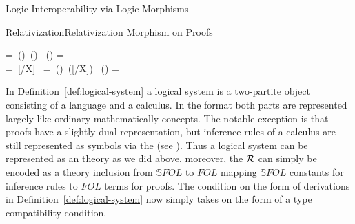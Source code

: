 \begin{tsubsection}[id=logic-morphisms]{Logic Interoperability via Logic Morphisms}
\begin{myfig}{Relativization}{Relativization Morphism on Proofs}
\begin{textnd}
{                        {\bA\bB\ofsort\sortc}
                        {}}
    =\hbox{
                        {\sortb(\bB)}
                        {\sortc(\bA\bB)}
                        {}}
    \cR\left(\raisebox{-.3cm}{\box0}\vspace*{-.5cm}\right)
    \;\;=\;\;\raisebox{-.8cm}{\box1}\\
    =\hbox{
                        {\bB\colon\sortb}
                        {[\bB/X]\bA}
                        {}}
    =\hbox{
                        {\sortb(\bB)}
                        {\cR([\bB/X]\bA)}
                        {}}
    \cR\left(\raisebox{-.3cm}{\box0}\vspace*{-.5cm}\right)
    \;\;=\;\;\raisebox{-.8cm}{\box1}
  \end{textnd}
\end{myfig}

In Definition~\ref{def:logical-system} a logical system is a two-partite object consisting
of a language and a calculus. In the {} {\omdoc}
format both parts are represented largely like ordinary mathematically concepts. The
notable exception is that proofs have a slightly dual representation, but inference rules
of a calculus are still represented as symbols via the
{} (see {}). Thus a logical system
can be represented as an {\omdoc} theory as we did above, moreover, the
{} ${\cal R}$ can simply be encoded as a theory inclusion from
${\mathbb S} FOL$ to $FOL$ mapping ${\mathbb S} FOL$ constants for inference rules to
$FOL$ terms for proofs. The condition on the form of derivations in
Definition~\ref{def:logical-system} now simply takes on the form of a type compatibility
condition.
\end{tsubsection}

